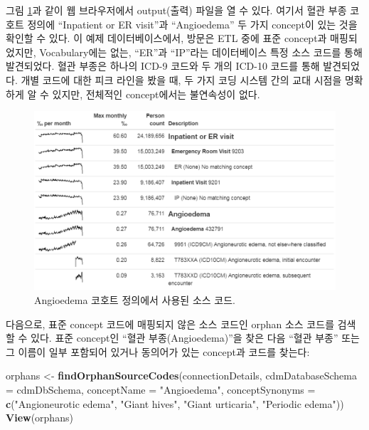\documentclass[10.5pt]{book}
\newenvironment{Shaded}{\begin{snugshade}}{\end{snugshade}}
\newcommand{\KeywordTok}[1]{\textcolor[rgb]{0.13,0.29,0.53}{\textbf{#1}}}
\newcommand{\DataTypeTok}[1]{\textcolor[rgb]{0.13,0.29,0.53}{#1}}
\newcommand{\StringTok}[1]{\textcolor[rgb]{0.31,0.60,0.02}{#1}}
\newcommand{\NormalTok}[1]{#1}
\theoremstyle{definition}
\theoremstyle{definition}
\theoremstyle{definition}
\theoremstyle{remark}
\begin{document}
그림 \ref{fig:sourceCodesAngioedema}과 같이 웹 브라우저에서 output(출력)
파일을 열 수 있다. 여기서 혈관 부종 코호트 정의에 ``Inpatient or ER
visit''과 ``Angioedema'' 두 가지 concept이 있는 것을 확인할 수 있다. 이
예제 데이터베이스에서, 방문은 ETL 중에 표준 concept과 매핑되었지만,
Vocabulary에는 없는, ``ER''과 ``IP''라는 데이터베이스 특정 소스 코드를
통해 발견되었다. 혈관 부종은 하나의 ICD-9 코드와 두 개의 ICD-10 코드를
통해 발견되었다. 개별 코드에 대한 피크 라인을 봤을 때, 두 가지 코딩
시스템 간의 교대 시점을 명확하게 알 수 있지만, 전체적인 concept에서는
불연속성이 없다.

\begin{figure}

{\centering \includegraphics[width=1\linewidth]{images/DataQuality/sourceCodesAngioedema} 

}

\caption{Angioedema 코호트 정의에서 사용된 소스 코드.}\label{fig:sourceCodesAngioedema}
\end{figure}

다음으로, 표준 concept 코드에 매핑되지 않은 소스 코드인 orphan 소스
코드를 검색할 수 있다. 표준 concept인 ``혈관 부종(Angioedema)''을 찾은
다음 ``혈관 부종'' 또는 그 이름이 일부 포함되어 있거나 동의어가 있는
concept과 코드를 찾는다:

\begin{Shaded}
\begin{Highlighting}[]
\NormalTok{orphans <-}\StringTok{ }\KeywordTok{findOrphanSourceCodes}\NormalTok{(connectionDetails,}
                                 \DataTypeTok{cdmDatabaseSchema =}\NormalTok{ cdmDbSchema,}
                                 \DataTypeTok{conceptName =} \StringTok{"Angioedema"}\NormalTok{,}
                                 \DataTypeTok{conceptSynonyms =} \KeywordTok{c}\NormalTok{(}\StringTok{"Angioneurotic edema"}\NormalTok{,}
                                                     \StringTok{"Giant hives"}\NormalTok{,}
                                                     \StringTok{"Giant urticaria"}\NormalTok{,}
                                                     \StringTok{"Periodic edema"}\NormalTok{))}
\KeywordTok{View}\NormalTok{(orphans)}
\end{Highlighting}
\end{Shaded}
\end{document}
